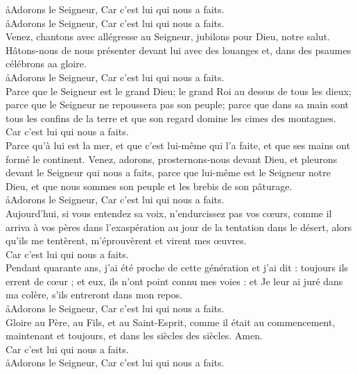 \documentclass[twoside]{article}
\begin{document}
\begin{paracol}[1]{2}
\aa Adorons le Seigneur, \GreSpecial{*} Car c'est lui qui nous a faits.\\
\aa Adorons le Seigneur, \GreSpecial{*} Car c'est lui qui nous a faits.\\
\vv Venez, chantons avec allégresse au Seigneur, jubilons pour Dieu, notre salut. Hâtons-nous de nous présenter devant lui avec des louanges et, dans des psaumes célébrons aa gloire.\\
\aa Adorons le Seigneur, \GreSpecial{*} Car c'est lui qui nous a faits.\\
\newpage
\vv Parce que le Seigneur est le grand Dieu; le grand Roi au dessus de tous les dieux; parce que le Seigneur ne repoussera pas son peuple; parce que dans sa main sont tous les confins de la terre et que son regard domine les cimes des montagnes.\\
\GreSpecial{*} Car c'est lui qui nous a faits.\\
\vv Parce qu'à lui est la mer, et que c'est lui-même qui l'a faite, et que ses mains ont formé le continent.  Venez, adorons, prosternons-nous devant Dieu, et pleurons devant le Seigneur qui nous a faits,  parce que lui-même est le Seigneur notre Dieu, et que nous sommes son peuple et les brebis de son pâturage.\\
\aa Adorons le Seigneur, \GreSpecial{*} Car c'est lui qui nous a faits.\\
\newpage
\vv Aujourd'hui, si vous entendez sa voix, n'endurcissez pas vos cœurs, comme il arriva à vos pères dans l'exaspération au jour de la tentation dans le désert, alors qu'ils me tentèrent, m'éprouvèrent et virent mes œuvres.\\
\GreSpecial{*} Car c'est lui qui nous a faits.\\
\vv Pendant quarante ans, j'ai été proche de cette génération et j'ai dit : toujours ils errent de cœur ; et eux, ils n'ont point connu mes voies : et Je leur ai juré dans ma colère, s'ils entreront dans mon repos.\\
\aa Adorons le Seigneur, \GreSpecial{*} Car c'est lui qui nous a faits.\\
\vv Gloire au Père, au Fils, et au Saint-Esprit, comme il était au commencement, maintenant et toujours, et dans les siècles des siècles. Amen.\\
\GreSpecial{*} Car c'est lui qui nous a faits.\\
\aa Adorons le Seigneur, \GreSpecial{*} Car c'est lui qui nous a faits.\\


\end{paracol}
\end{document}
